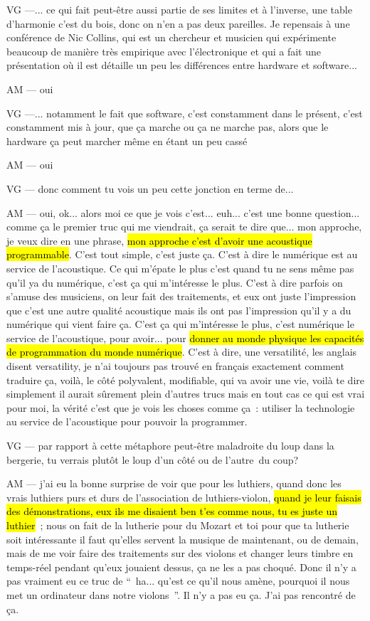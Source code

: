 VG —... ce qui fait peut-être aussi partie de ses limites et à l'inverse, une table d'harmonie c'est du bois, donc on n'en a pas deux pareilles. Je repensais à une conférence de Nic Collins, qui est un chercheur et musicien qui expérimente beaucoup de manière très empirique avec l'électronique et qui a fait une présentation où il est détaille un peu les différences entre hardware et software... 

AM — oui 

VG —... notamment le fait que software, c'est constamment dans le présent, c'est constamment mis à jour, que ça marche ou ça ne marche pas, alors que le hardware ça peut marcher même en étant un peu cassé

AM — oui

VG — donc comment tu vois un peu cette jonction en terme de... 

AM — oui, ok... alors moi ce que je vois c'est... euh... c'est une bonne question... comme ça le premier truc qui me viendrait, ça serait te dire que... mon approche, je veux dire en une phrase, \hl{mon approche c'est d'avoir une acoustique programmable}. C'est tout simple, c'est juste ça. C'est à dire le numérique est au service de l'acoustique. Ce qui m'épate le plus c'est quand tu ne sens même pas qu'il ya du numérique, c'est ça qui m'intéresse le plus. C'est à dire parfois on s'amuse des musiciens, on leur fait des traitements, et eux ont juste l'impression que c'est une autre qualité acoustique mais ils ont pas l'impression qu'il y a du numérique qui vient faire ça. C'est ça qui m'intéresse le plus, c'est numérique le service de l'acoustique, pour avoir... pour \hl{donner au monde physique les capacités de programmation du monde numérique}. C'est à dire, une versatilité, les anglais disent versatility, je n'ai toujours pas trouvé en français exactement comment traduire ça, voilà, le côté polyvalent, modifiable, qui va avoir une vie, voilà te dire simplement il aurait sûrement plein d'autres trucs mais en tout cas ce qui est vrai pour moi, la vérité c'est que je vois les choses comme ça : utiliser la technologie au service de l'acoustique pour pouvoir la programmer.

VG — par rapport à cette métaphore peut-être maladroite du loup dans la bergerie, tu verrais plutôt le loup d'un côté ou de l'autre du coup?

AM — j'ai eu la bonne surprise de voir que pour les luthiers, quand donc les vrais luthiers purs et durs de l'association de luthiers-violon, \hl{quand je leur faisais des démonstrations, eux ils me disaient ben t'es comme nous, tu es juste un luthier} ; nous on fait de la lutherie pour du Mozart et toi pour que ta lutherie soit intéressante il faut qu'elles servent la musique de maintenant, ou  de demain, mais de me voir faire des traitements sur des violons et changer leurs timbre en temps-réel pendant qu'eux jouaient dessus, ça ne les a pas choqué. Donc il n'y a pas vraiment eu ce truc de “ ha... qu'est ce qu'il nous amène, pourquoi il nous met un ordinateur dans notre violons ”. Il n'y a pas eu ça. J'ai pas rencontré de ça. 

